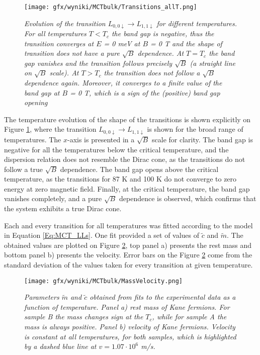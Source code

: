 \documentclass[titlepage,a4paper]{book}
\begin{document}
\begin{figure}[ht]
	\centering
	\texttt{[image: gfx/wyniki/MCTbulk/Transitions\_allT.png]}
	\vspace{-10pt}
	\caption{\textit{Evolution of the transition $L_{0,0\downarrow} \rightarrow L_{1,1\downarrow}$ for different temperatures. For all temperatures $T < T_c$ the band gap is negative, thus the transition converges at $E$ = 0 meV at $B$ = 0 T and the shape of transition does not have a pure $\sqrt{B}$ dependence. At $T = T_c$ the band gap vanishes and the transition follows precisely $\sqrt{B}$ (a straight line on $\sqrt{B}$ scale). At $T > T_c$ the transition does not follow a $\sqrt{B}$ dependence again. Moreover, it converges to a finite value of the band gap at $B$ = 0 T, which is a sign of the (positive) band gap opening}}
	\label{fig:Bulk_Transitions_allT}
\end{figure}
The temperature evolution of the shape of the transitions is shown explicitly on Figure \ref{fig:Bulk_Transitions_allT}, where the transition $L_{0,0\downarrow} \rightarrow L_{1,1\downarrow}$ is shown for the broad range of temperatures. The $x$-axis is presented in a $\sqrt{B}$ scale for clarity. The band gap is negative for all the temperatures below the critical temperature, and the dispersion relation does not resemble the Dirac cone, as the transitions do not follow a true $\sqrt{B}$ dependence. The band gap opens above the critical temperature, as the transitions for 87 K and 100 K do not converge to zero energy at zero magnetic field. Finally, at the critical temperature, the band gap vanishes completely, and a pure $\sqrt{B}$ dependence is observed, which confirms that the system exhibits a true Dirac cone.

Each and every transition for all temperatures was fitted according to the model in Equation \ref{Eq:MCT_LLs}. One fit provided a set of values of $\tilde{c}$ and $\tilde{m}$. The obtained values are plotted on Figure \ref{fig:Bulk_MassVelocity}, top panel a) presents the rest mass and bottom panel b) presents the velocity. Error bars on the Figure \ref{fig:Bulk_MassVelocity} come from the standard deviation of the values taken for every transition at given temperature.

\begin{figure}[ht]
	\centering
	\texttt{[image: gfx/wyniki/MCTbulk/MassVelocity.png]}
	\vspace{-10pt}
	\caption{\textit{Parameters $\tilde{m}$ and $\tilde{c}$ obtained from fits to the experimental data as a function of temperature. Panel a) rest mass of Kane fermions. For sample B the mass changes sign at the $T_c$, while for sample A the mass is always positive. Panel b) velocity of Kane fermions. Velocity is constant at all temperatures, for both samples, which is highlighted by a dashed blue line at $v = 1.07 \cdot 10^6$ m/s. }}
	\label{fig:Bulk_MassVelocity}
\end{figure}
\end{document}
